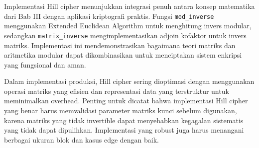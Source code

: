 Implementasi Hill cipher menunjukkan integrasi penuh antara konsep matematika dari Bab III dengan aplikasi kriptografi praktis. Fungsi \texttt{mod\_inverse} menggunakan Extended Euclidean Algorithm untuk menghitung invers modular, sedangkan \texttt{matrix\_inverse} mengimplementasikan adjoin kofaktor untuk invers matriks. Implementasi ini mendemonstrasikan bagaimana teori matriks dan aritmetika modular dapat dikombinasikan untuk menciptakan sistem enkripsi yang fungsional dan aman.

Dalam implementasi produksi, Hill cipher sering dioptimasi dengan menggunakan operasi matriks yang efisien dan representasi data yang terstruktur untuk meminimalkan overhead. Penting untuk dicatat bahwa implementasi Hill cipher yang benar harus memvalidasi parameter matriks kunci sebelum digunakan, karena matriks yang tidak invertible dapat menyebabkan kegagalan sistematis yang tidak dapat dipulihkan. Implementasi yang robust juga harus menangani berbagai ukuran blok dan kasus edge dengan baik.

